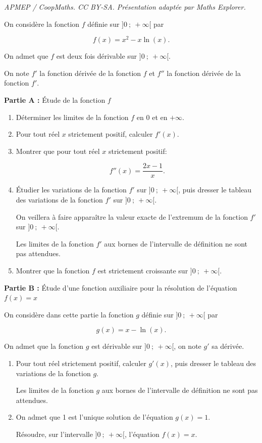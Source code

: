 \documentclass[10pt]{article}
\begin{document}
\noindent\textit{APMEP / CoopMaths. CC BY-SA. Présentation adaptée par Maths Explorer.}\par\medskip
\medskip

On considère la fonction $f$ définie sur $]0 ~;~+ \infty[$ par 

\[f(x) = x^2 - x \ln (x).\]

On admet que $f$ est deux fois dérivable sur $]0 ~;~+ \infty[$.

On note $f'$ la fonction dérivée de la fonction $f$ et $f''$ la fonction dérivée de la fonction $f'$.

\medskip

\textbf{Partie A :} Étude de la fonction $f$

\medskip

\begin{enumerate}
\item Déterminer les limites de la fonction $f$ en $0$ et en $+\infty$.
\item Pour tout réel $x$ strictement positif, calculer $f'(x)$.
\item Montrer que pour tout réel $x$ strictement positif:

\[f''(x) = \dfrac{2x - 1}{x}.\]

\item Étudier les variations de la fonction $f'$ sur $]0 ~;~+ \infty[$, puis dresser le tableau des variations de la fonction $f'$ sur $]0 ~;~+ \infty[$.

On veillera à faire apparaître la valeur exacte de l'extremum de la fonction $f'$ sur $]0 ~;~+ \infty[$.

Les limites de la fonction $f'$ aux bornes de l'intervalle de définition ne sont pas attendues.
\item Montrer que la fonction $f$ est strictement croissante sur $]0 ~;~+ \infty[$.
\end{enumerate}

\medskip

\textbf{Partie B :} Étude d'une fonction auxiliaire pour la résolution de l'équation $f(x) = x $

\medskip

On considère dans cette partie la fonction $g$ définie sur $]0 ~;~+ \infty[$ par 

\[g(x) = x - \ln (x).\]

On admet que la fonction $g$ est dérivable sur $]0 ~;~+ \infty[$, on note $g'$ sa dérivée.

\medskip

\begin{enumerate}
\item Pour tout réel strictement positif, calculer $g'(x)$, puis dresser le tableau des variations de la fonction $g$.

Les limites de la fonction $g$ aux bornes de l'intervalle de définition ne sont pas attendues.
\item On admet que 1 est l'unique solution de l'équation $g(x) = 1$.

Résoudre, sur l'intervalle $]0 ~;~+ \infty[$, l'équation $f(x) = x$.
\end{enumerate}
\end{document}
